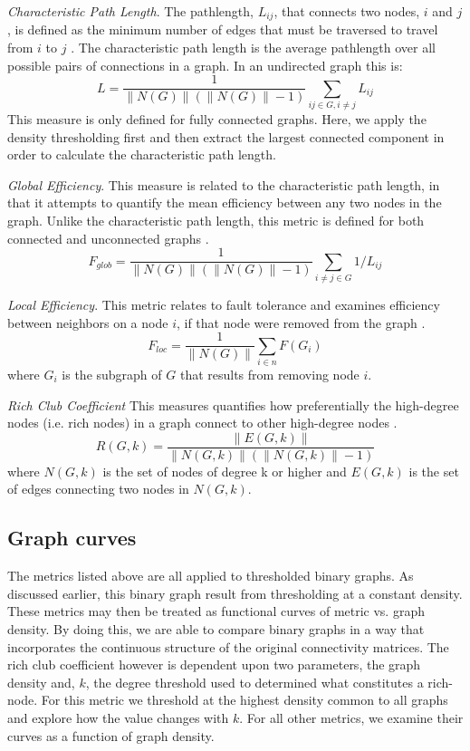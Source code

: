 \documentclass{frontiersSCNS} %
\begin{document}
\emph{Characteristic Path Length}. The pathlength, $L_{ij}$, that connects two nodes, $i$ and $j$, is defined as the minimum number of edges that must be traversed to travel from $i$ to $j$ \citep{Dijkstra1959}. The characteristic path length is the average pathlength over all possible pairs of connections in a graph. In an undirected graph this is:
$$L = \frac{1}{\|N(G)\|(\|N(G)\|-1)} \sum_{ij \in G, i \neq j}{L_{ij}}$$
This measure is only defined for fully connected graphs. Here, we apply the density thresholding first and then extract the largest connected component in order to calculate the characteristic path length.

\emph{Global Efficiency}. This measure is related to the
characteristic path length, in that it attempts to quantify the mean
efficiency between any two nodes in the graph. Unlike the
characteristic path length, this metric is defined for both connected and unconnected graphs \citep{Latora2001}.
$$F_{glob} = \frac{1}{\|N(G)\|(\|N(G)\|-1)} \sum_{i \neq j \in G}{1/L_{ij}}$$

\emph{Local Efficiency}. This metric relates to fault tolerance and examines efficiency between neighbors on a node $i$, if that node were removed from the graph \citep{Latora2001}.
$$F_{loc} = \frac{1}{\|N(G)\|} \sum_{i \in n}{F(G_i)}$$
where $G_i$ is the subgraph of $G$ that results from removing node $i$.

\emph{Rich Club Coefficient}
This measures quantifies how preferentially the high-degree nodes (i.e. rich nodes)  in a graph connect to other high-degree nodes \citep{Colizza2006}.
$$ R(G,k) = \frac{ \|E(G,k)\| }{ \|N(G,k)\| ( \|N(G,k)\|-1 ) } $$
where $N(G,k)$ is the set of nodes of degree k or higher and $E(G,k)$ is the set of edges connecting two nodes in $N(G,k)$.


\subsection{Graph curves}
The metrics listed above are all applied to thresholded binary graphs. As discussed earlier, this binary graph result from thresholding at a constant density. These metrics may then be treated as functional curves of metric vs. graph density. By doing this, we are able to compare binary graphs in a way that incorporates the continuous structure of the original connectivity matrices. The rich club coefficient however is dependent upon two parameters, the graph density and, $k$, the degree threshold used to determined what constitutes a rich-node. For this metric we threshold at the highest density common to all graphs and explore how the value changes with $k$. For all other metrics, we examine their curves as a function of graph density. 
\end{document}
